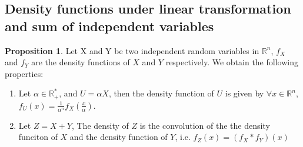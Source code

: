 \documentclass[a4paper,10pt]{article}
\theoremstyle{definition} %
\theoremstyle{definition} %
\newtheorem{proposition}[definition]{Proposition}
\theoremstyle{definition} %
\theoremstyle{definition} %
\newcommand{\R}{\mathbb{R}}
\newcommand{\0}{\boldsymbol{0}}
\begin{document}
\subsection{Density functions under linear transformation and sum of independent variables}
\begin{proposition}\label{prop:quelques_resultats_sur_la_densite}
    Let X and Y be two independent random variables in $\R^n$, $f_X$ and $f_Y$ are the density functions of $X$ and $Y$ respectively. We obtain the following properties:
\begin{enumerate}[label=(\roman*)]
    \item[] Let $\alpha \in \R_+^*$, and $U = \alpha X$, then the density function of $U$ is given by $\forall x\in \R^n$, $f_U(x) = \frac{1}{\alpha^n} f_X(\frac{x}{\alpha})$.
    \item[] Let $Z = X+Y$, The density of $Z$ is the convolution of the the density funciton of $X$ and the density function of $Y$, i.e. $f_Z(x) = (f_X * f_Y)(x)$
\end{enumerate}
\end{proposition}
\end{document}

